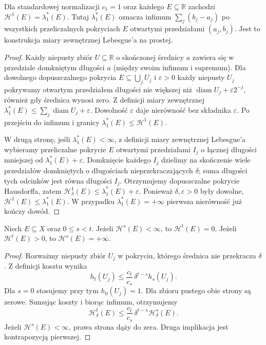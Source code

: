 \begin{twierdzenie}
\label{thm:hausdorff-line-26}
Dla standardowej normalizacji $c_1=1$ oraz
każdego $E\subseteq\mathbb R$ zachodzi
$\mathcal H^1(E)=\lambda_1^*(E)$.
Tutaj $\lambda_1^*(E)$ oznacza infimum
$\sum_j(b_j-a_j)$ po wszystkich przeliczalnych
pokryciach $E$ otwartymi przedziałami $(a_j,b_j)$.
Jest to konstrukcja miary zewnętrznej Lebesgue'a
na prostej.
\end{twierdzenie}
\begin{proof}
Każdy niepusty zbiór $U\subseteq\mathbb R$
o skończonej średnicy $a$ zawiera się w przedziale
domkniętym długości $a$ (między swoim infimum
i supremum). Dla dowolnego dopuszczalnego pokrycia
$E\subseteq\bigcup_jU_j$ i $\varepsilon>0$ każdy niepusty $U_j$ pokrywamy otwartym przedziałem długości nie większej niż $\operatorname{diam}U_j+\varepsilon 2^{-j}$, również gdy średnica wynosi zero. Z definicji miary zewnętrznej
$\lambda_1^*(E)\leq\sum_j\operatorname{diam}U_j+\varepsilon$. Dowolność $\varepsilon$ daje nierówność bez składnika $\varepsilon$.
Po przejściu do infimum i granicy
$\lambda_1^*(E)\leq\mathcal H^1(E)$.

W drugą stronę, jeśli $\lambda_1^*(E)<\infty$,
z definicji miary zewnętrznej Lebesgue'a
wybieramy przeliczalne pokrycie $E$ otwartymi
przedziałami $I_j$ o łącznej długości
mniejszej od $\lambda_1^*(E)+\varepsilon$.
Domknięcie każdego $I_j$ dzielimy na skończenie wiele
przedziałów domkniętych o długościach
nieprzekraczających $\delta$; suma długości
tych odcinków jest równa długości $I_j$.
Otrzymujemy dopuszczalne pokrycie Hausdorffa,
zatem $\mathcal H^1_\delta(E)\leq
\lambda_1^*(E)+\varepsilon$.
Ponieważ $\delta,\varepsilon>0$ były dowolne,
$\mathcal H^1(E)\leq\lambda_1^*(E)$.
W przypadku $\lambda_1^*(E)=+\infty$
pierwsza nierówność już kończy dowód.
\end{proof}

\begin{lemat}
\label{lem:hausdorff-threshold-26}
Niech $E\subseteq X$ oraz $0\le s<t$. Jeżeli
$\mathcal H^s(E)<\infty$, to $\mathcal H^t(E)=0$.
Jeżeli $\mathcal H^t(E)>0$, to $\mathcal H^s(E)=+\infty$.
\end{lemat}
\begin{proof}
Rozważmy niepusty zbiór $U_j$ w pokryciu,
którego średnica nie przekracza $\delta$.
Z definicji kosztu wynika
\[
 h_t(U_j)\le\frac{c_t}{c_s}\,\delta^{t-s}h_s(U_j).
\]
Dla $s=0$ stosujemy przy tym $h_0(U_j)=1$.
Dla zbioru pustego obie strony są zerowe.
Sumując koszty i biorąc infimum, otrzymujemy
\[
\mathcal H^t_\delta(E)\le
\frac{c_t}{c_s}\,\delta^{t-s}\mathcal H^s_\delta(E).
\]
Jeżeli $\mathcal H^s(E)<\infty$, prawa strona dąży
do zera. Druga implikacja jest kontrapozycją pierwszej.
\end{proof}

